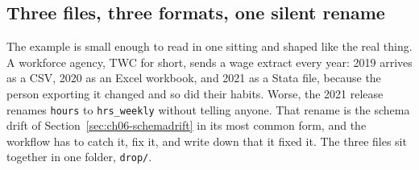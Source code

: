 \subsection{Three files, three formats, one silent rename}
The example is small enough to read in one sitting and shaped like the real thing. A workforce agency, TWC for short, sends a wage extract every year: 2019 arrives as a CSV, 2020 as an Excel workbook, and 2021 as a Stata file, because the person exporting it changed and so did their habits. Worse, the 2021 release renames \texttt{hours} to \texttt{hrs\_weekly} without telling anyone. That rename is the schema drift of Section~\ref{sec:ch06-schemadrift} in its most common form, and the workflow has to catch it, fix it, and write down that it fixed it. The three files sit together in one folder, \texttt{drop/}.

